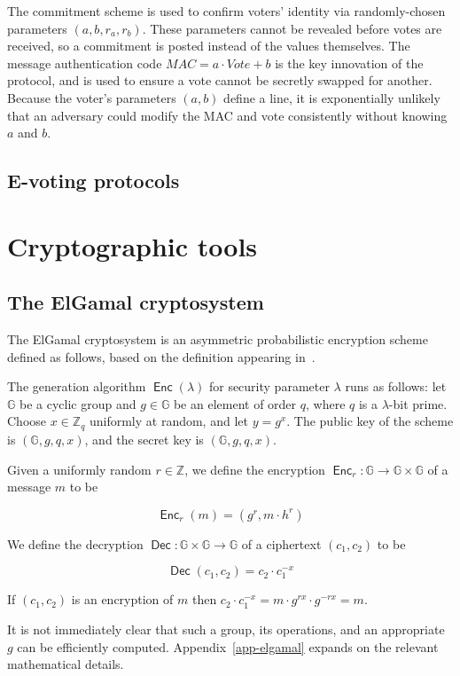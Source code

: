 \documentclass[11pt,twoside,a4paper]{article}
\DeclareMathOperator{\Gen}{\mathsf{Enc}}
\DeclareMathOperator{\Enc}{\mathsf{Enc}}
\DeclareMathOperator{\Dec}{\mathsf{Dec}}
\theoremstyle{definition}
\newcommand{\Vote}{\mathit{Vote}}
\newcommand{\Mac}{\mathit{MAC}}
\begin{document}
The commitment scheme is used to confirm voters' identity via randomly-chosen parameters $(a, b, r_a, r_b)$. These parameters cannot be revealed before votes are received, so a commitment is posted instead of the values themselves. The message authentication code $\Mac = a\cdot \Vote+b$ is the key innovation of the protocol, and is used to ensure a vote cannot be secretly swapped for another. Because the voter's parameters $(a, b)$ define a line, it is exponentially unlikely that an adversary could modify the MAC and vote consistently without knowing $a$ and $b$.
\subsection{E-voting protocols}
\section{Cryptographic tools}\label{sec-crypto}
\subsection{The ElGamal cryptosystem}
The ElGamal cryptosystem is an asymmetric probabilistic encryption scheme defined as follows, based on the definition appearing in~\cite{katz2014introduction}.
\begin{definition}\label{def-elgamal}
    The generation algorithm $\Gen(\lambda)$ for security parameter $\lambda$ runs as follows: let $\mathbb{G}$ be a cyclic group and $g\in\mathbb{G}$ be an element of order $q$, where $q$ is a $\lambda$-bit prime. Choose $x\in\mathbb{Z}_q$ uniformly at random, and let $y=g^x$. The public key of the scheme is $(\mathbb{G}, g, q, x)$, and the secret key is $(\mathbb{G}, g, q, x)$.

    Given a uniformly random $r\in\mathbb{Z}$, we define the encryption $\Enc_r:\mathbb{G}\rightarrow\mathbb{G}\times\mathbb{G}$ of a message $m$ to be
    
    $$\Enc_r(m) = (g^r, m\cdot h^r)$$

    We define the decryption $\Dec:\mathbb{G}\times\mathbb{G}\rightarrow \mathbb{G}$ of a ciphertext $(c_1, c_2)$ to be
    
    $$\Dec(c_1,c_2)=c_2\cdot c_1^{-x}$$

    If $(c_1,c_2)$ is an encryption of $m$ then $c_2\cdot c_1^{-x}=m\cdot g^{rx}\cdot g^{-rx}=m$.
\end{definition}
It is not immediately clear that such a group, its operations, and an appropriate $g$ can be efficiently computed. Appendix~\ref{app-elgamal} expands on the relevant mathematical details.
\end{document}
